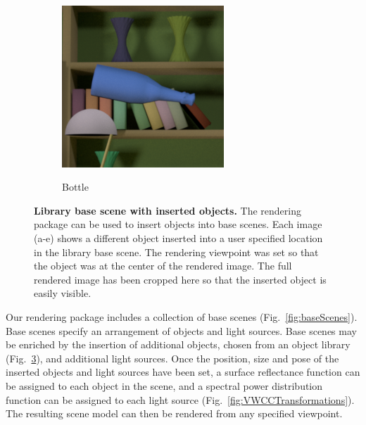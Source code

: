 \documentclass{jov}
\begin{document}
\begin{figure}
\begin{subfigure}[b]{0.14 \textwidth}
        \label{fig:libraryWithRingToy}
    \end{subfigure}
        ~
    	\begin{subfigure}[b]{0.14 \textwidth}
        \caption{Bottle}
        \includegraphics[width=\textwidth]{../FiguresDraft5/Figure3/Figure3_e.png}
        \label{fig:libraryWithChampagneBottle}
    \end{subfigure}
\caption{{\bf Library base scene with inserted objects.} The rendering package can be used to insert objects into base scenes. Each image (a-e) shows a different object inserted into a user specified location in the library base scene. The rendering viewpoint was set so that the object was at the center of the rendered image. The full rendered image has been cropped here so that the inserted object is easily visible.}\label{fig:libraryWithTarget}
\end{figure}

Our rendering package includes a collection of base scenes (Fig.~\ref{fig:baseScenes}).
Base scenes specify an arrangement of objects and light sources.
Base scenes may be enriched by the insertion of additional objects, chosen from an object library (Fig.~\ref{fig:libraryWithTarget}), and additional light sources.
Once the position, size and pose of the inserted objects and light sources have been set, 
a surface reflectance function can be assigned to each object in the scene, and a spectral power distribution function can be assigned to each light source (Fig.~\ref{fig:VWCCTransformations}). The resulting scene model can then be rendered from any specified viewpoint.
\end{document}
